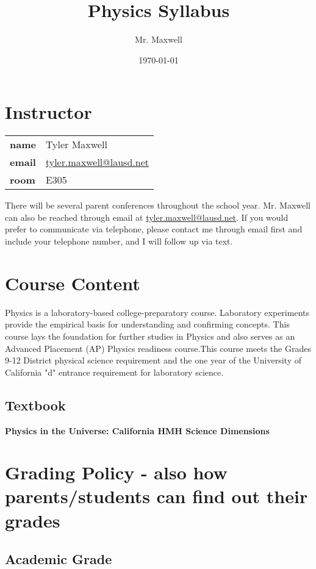 \documentclass[11pt]{article}
\author{Mr. Maxwell}
\date{\today}
\title{Physics Syllabus}
\begin{document}
\section{Instructor}
\label{sec:org7db42cd}

\begin{center}
\begin{tabular}{ll}
\textbf{\textbf{name}} & Tyler Maxwell\\[0pt]
\textbf{\textbf{email}} & \href{mailto:tyler.maxwell@lausd.net}{tyler.maxwell@lausd.net}\\[0pt]
\textbf{\textbf{room}} & E305\\[0pt]
\end{tabular}
\end{center}

There will be several parent conferences throughout the school year. Mr. Maxwell can also be reached through email at \href{mailto:tyler.maxwell@lausd.net}{tyler.maxwell@lausd.net}. If you would prefer to communicate via telephone, please contact me through email first and include your telephone number, and I will follow up via text.

\section{Course Content}
\label{sec:org5c92d93}

Physics is a laboratory-based college-preparatory course. Laboratory experiments provide the empirical basis for understanding and confirming concepts. This course lays the foundation for further studies in Physics and also serves as an Advanced Placement (AP) Physics readiness course.This course meets the Grades 9-12 District physical science requirement and the one year of the University of California "d" entrance requirement for laboratory science.

\subsection{Textbook}
\label{sec:orgbc975e7}

\textbf{\textbf{Physics in the Universe: California HMH Science Dimensions}}

\section{Grading Policy - also how parents/students can find out their grades}
\label{sec:orgbf16ff4}
\subsection{Academic Grade}
\label{sec:org1178606}
\end{document}
